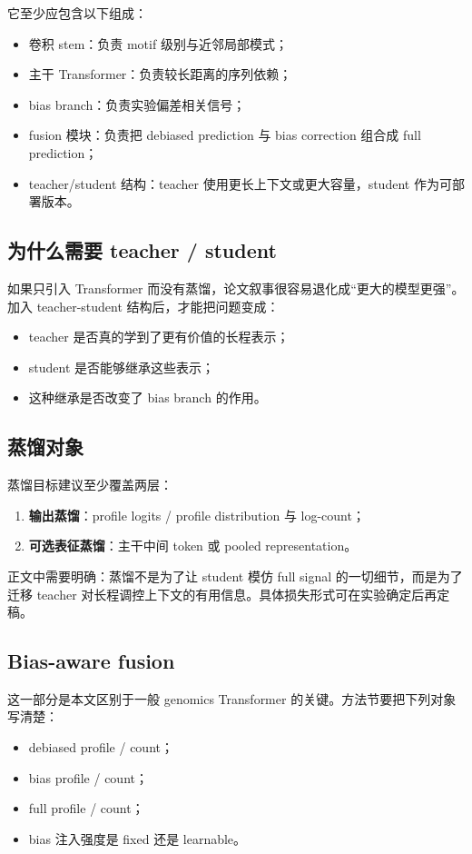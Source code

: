\documentclass[11pt,a4paper]{ctexart}
\begin{document}
它至少应包含以下组成：
\begin{itemize}[leftmargin=2em]
  \item 卷积 stem：负责 motif 级别与近邻局部模式；
  \item 主干 Transformer：负责较长距离的序列依赖；
  \item bias branch：负责实验偏差相关信号；
  \item fusion 模块：负责把 debiased prediction 与 bias correction 组合成 full prediction；
  \item teacher/student 结构：teacher 使用更长上下文或更大容量，student 作为可部署版本。
\end{itemize}

\subsection{为什么需要 teacher / student}
如果只引入 Transformer 而没有蒸馏，论文叙事很容易退化成“更大的模型更强”。加入
teacher-student 结构后，才能把问题变成：
\begin{itemize}[leftmargin=2em]
  \item teacher 是否真的学到了更有价值的长程表示；
  \item student 是否能够继承这些表示；
  \item 这种继承是否改变了 bias branch 的作用。
\end{itemize}

\subsection{蒸馏对象}
蒸馏目标建议至少覆盖两层：
\begin{enumerate}[leftmargin=2em]
  \item \textbf{输出蒸馏}：profile logits / profile distribution 与 log-count；
  \item \textbf{可选表征蒸馏}：主干中间 token 或 pooled representation。
\end{enumerate}

正文中需要明确：蒸馏不是为了让 student 模仿 full signal 的一切细节，而是为了迁移
teacher 对长程调控上下文的有用信息。具体损失形式可在实验确定后再定稿。

\subsection{Bias-aware fusion}
这一部分是本文区别于一般 genomics Transformer 的关键。方法节要把下列对象写清楚：
\begin{itemize}[leftmargin=2em]
  \item debiased profile / count；
  \item bias profile / count；
  \item full profile / count；
  \item bias 注入强度是 fixed 还是 learnable。
\end{itemize}
\end{document}

